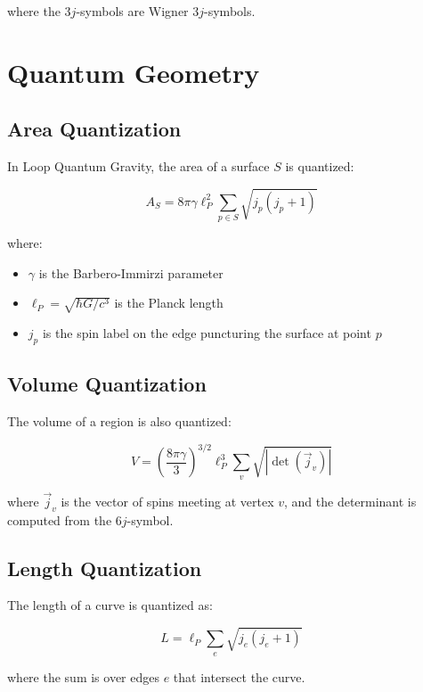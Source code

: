 \documentclass[12pt,a4paper]{article}
\begin{document}
where the $3j$-symbols are Wigner $3j$-symbols.

\section{Quantum Geometry}

\subsection{Area Quantization}

In Loop Quantum Gravity, the area of a surface $S$ is quantized:

\begin{equation}
A_S = 8\pi \gamma \ell_P^2 \sum_{p \in S} \sqrt{j_p(j_p + 1)}
\end{equation}

where:
\begin{itemize}
    \item $\gamma$ is the Barbero-Immirzi parameter
    \item $\ell_P = \sqrt{\hbar G/c^3}$ is the Planck length
    \item $j_p$ is the spin label on the edge puncturing the surface at point $p$
\end{itemize}

\subsection{Volume Quantization}

The volume of a region is also quantized:

\begin{equation}
V = \left( \frac{8\pi \gamma}{3} \right)^{3/2} \ell_P^3 \sum_v \sqrt{|\det(\vec{j}_v)|}
\end{equation}

where $\vec{j}_v$ is the vector of spins meeting at vertex $v$, and the determinant is computed from the $6j$-symbol.

\subsection{Length Quantization}

The length of a curve is quantized as:

\begin{equation}
L = \ell_P \sum_e \sqrt{j_e(j_e + 1)}
\end{equation}

where the sum is over edges $e$ that intersect the curve.
\end{document}
